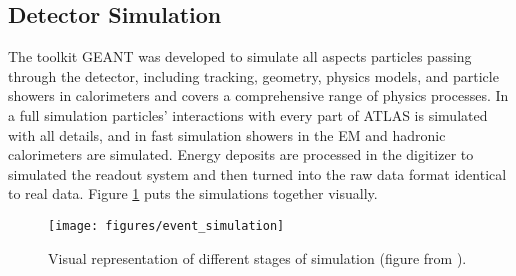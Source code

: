\subsection{Detector Simulation}

The toolkit GEANT\cite{GEANT} was developed to simulate all aspects particles passing through the detector, including tracking, geometry, physics models, and particle showers in calorimeters and covers a comprehensive range of physics processes.  In a full simulation particles' interactions with every part of ATLAS is simulated with all details, and in fast simulation showers in the EM and hadronic calorimeters are simulated.  Energy deposits are processed in the digitizer to simulated the readout system and then turned into the raw data format identical to real data.  Figure \ref{fig:eventsimulation} puts the simulations together visually.

\begin{figure}[!htb]
	\centering
	\texttt{[image: figures/event\_simulation]}
	\caption[Representation of different stages of simulation]{Visual  representation of different stages of simulation (figure from \cite{event_simulation:NBartosik}).}
	\label{fig:eventsimulation}
\end{figure}